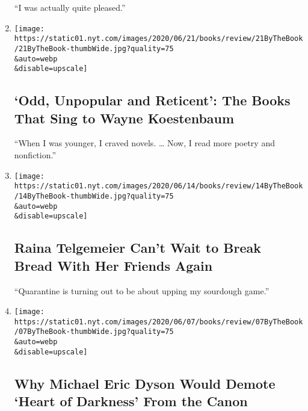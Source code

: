 \begin{enumerate}
  ``I was actually quite pleased.''
\item
  \href{/2020/06/18/books/review/wayne-koestenbaum-by-the-book-interview.html}{}

  \texttt{[image: https://static01.nyt.com/images/2020/06/21/books/review/21ByTheBook/21ByTheBook-thumbWide.jpg?quality=75\\\&auto=webp\\\&disable=upscale]}

  \hypertarget{odd-unpopular-and-reticent-the-books-that-sing-to-wayne-koestenbaum}{%
  \subsection{`Odd, Unpopular and Reticent': The Books That Sing to
  Wayne
  Koestenbaum}\label{odd-unpopular-and-reticent-the-books-that-sing-to-wayne-koestenbaum}}

  ``When I was younger, I craved novels. \ldots{} Now, I read more
  poetry and nonfiction.''
\item
  \href{/2020/06/11/books/review/raina-telgemeier-by-the-book-interview.html}{}

  \texttt{[image: https://static01.nyt.com/images/2020/06/14/books/review/14ByTheBook/14ByTheBook-thumbWide.jpg?quality=75\\\&auto=webp\\\&disable=upscale]}

  \hypertarget{raina-telgemeier-cant-wait-to-break-bread-with-her-friends-again}{%
  \subsection{Raina Telgemeier Can't Wait to Break Bread With Her
  Friends
  Again}\label{raina-telgemeier-cant-wait-to-break-bread-with-her-friends-again}}

  ``Quarantine is turning out to be about upping my sourdough game.''
\item
  \href{/2020/06/04/books/review/michael-eric-dyson-by-the-book-interview.html}{}

  \texttt{[image: https://static01.nyt.com/images/2020/06/07/books/review/07ByTheBook/07ByTheBook-thumbWide.jpg?quality=75\\\&auto=webp\\\&disable=upscale]}

  \hypertarget{why-michael-eric-dyson-would-demote-heart-of-darkness-from-the-canon}{%
  \subsection{Why Michael Eric Dyson Would Demote `Heart of Darkness'
  From the
  Canon}\label{why-michael-eric-dyson-would-demote-heart-of-darkness-from-the-canon}}


\end{enumerate}
